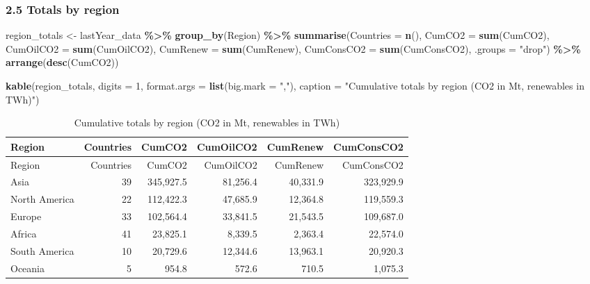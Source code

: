 \documentclass[
]{article}
\newenvironment{Shaded}{\begin{snugshade}}{\end{snugshade}}
\newcommand{\AttributeTok}[1]{\textcolor[rgb]{0.13,0.29,0.53}{#1}}
\newcommand{\DecValTok}[1]{\textcolor[rgb]{0.00,0.00,0.81}{#1}}
\newcommand{\FunctionTok}[1]{\textcolor[rgb]{0.13,0.29,0.53}{\textbf{#1}}}
\newcommand{\NormalTok}[1]{#1}
\newcommand{\OtherTok}[1]{\textcolor[rgb]{0.56,0.35,0.01}{#1}}
\newcommand{\SpecialCharTok}[1]{\textcolor[rgb]{0.81,0.36,0.00}{\textbf{#1}}}
\newcommand{\StringTok}[1]{\textcolor[rgb]{0.31,0.60,0.02}{#1}}
\begin{document}
\subsubsection{2.5 Totals by region}\label{totals-by-region}

\begin{Shaded}
\begin{Highlighting}[]
\NormalTok{region\_totals }\OtherTok{\textless{}{-}}\NormalTok{ lastYear\_data }\SpecialCharTok{\%\textgreater{}\%}
  \FunctionTok{group\_by}\NormalTok{(Region) }\SpecialCharTok{\%\textgreater{}\%}
  \FunctionTok{summarise}\NormalTok{(}\AttributeTok{Countries =} \FunctionTok{n}\NormalTok{(),}
            \AttributeTok{CumCO2 =} \FunctionTok{sum}\NormalTok{(CumCO2),}
            \AttributeTok{CumOilCO2 =} \FunctionTok{sum}\NormalTok{(CumOilCO2),}
            \AttributeTok{CumRenew =} \FunctionTok{sum}\NormalTok{(CumRenew),}
            \AttributeTok{CumConsCO2 =} \FunctionTok{sum}\NormalTok{(CumConsCO2),}
            \AttributeTok{.groups =} \StringTok{"drop"}\NormalTok{) }\SpecialCharTok{\%\textgreater{}\%}
  \FunctionTok{arrange}\NormalTok{(}\FunctionTok{desc}\NormalTok{(CumCO2))}

\FunctionTok{kable}\NormalTok{(region\_totals, }\AttributeTok{digits =} \DecValTok{1}\NormalTok{, }\AttributeTok{format.args =} \FunctionTok{list}\NormalTok{(}\AttributeTok{big.mark =} \StringTok{","}\NormalTok{),}
      \AttributeTok{caption =} \StringTok{"Cumulative totals by region (CO2 in Mt, renewables in TWh)"}\NormalTok{)}
\end{Highlighting}
\end{Shaded}

\begin{longtable}[]{@{}lrrrrr@{}}
\caption{Cumulative totals by region (CO2 in Mt, renewables in
TWh)}\tabularnewline
\toprule\noalign{}
Region & Countries & CumCO2 & CumOilCO2 & CumRenew & CumConsCO2 \\
\midrule\noalign{}
\endfirsthead
\toprule\noalign{}
Region & Countries & CumCO2 & CumOilCO2 & CumRenew & CumConsCO2 \\
\midrule\noalign{}
\endhead
\bottomrule\noalign{}
\endlastfoot
Asia & 39 & 345,927.5 & 81,256.4 & 40,331.9 & 323,929.9 \\
North America & 22 & 112,422.3 & 47,685.9 & 12,364.8 & 119,559.3 \\
Europe & 33 & 102,564.4 & 33,841.5 & 21,543.5 & 109,687.0 \\
Africa & 41 & 23,825.1 & 8,339.5 & 2,363.4 & 22,574.0 \\
South America & 10 & 20,729.6 & 12,344.6 & 13,963.1 & 20,920.3 \\
Oceania & 5 & 954.8 & 572.6 & 710.5 & 1,075.3 \\
\end{longtable}
\end{document}

